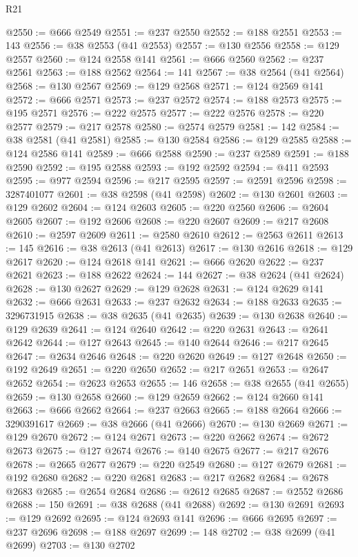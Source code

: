\begin{lexlean}{R21}
\begin{coremodule}
@2550 := @666 @2549
@2551 := @237 @2550
@2552 := @188 @2551
@2553 := 143
@2556 := @38 @2553 (@41 @2553)
@2557 := @130 @2556
@2558 := @129 @2557
@2560 := @124 @2558 @141
@2561 := @666 @2560
@2562 := @237 @2561
@2563 := @188 @2562
@2564 := 141
@2567 := @38 @2564 (@41 @2564)
@2568 := @130 @2567
@2569 := @129 @2568
@2571 := @124 @2569 @141
@2572 := @666 @2571
@2573 := @237 @2572
@2574 := @188 @2573
@2575 := @195 @2571
@2576 := @222 @2575
@2577 := @222 @2576
@2578 := @220 @2577
@2579 := @217 @2578
@2580 := @2574 @2579
@2581 := 142
@2584 := @38 @2581 (@41 @2581)
@2585 := @130 @2584
@2586 := @129 @2585
@2588 := @124 @2586 @141
@2589 := @666 @2588
@2590 := @237 @2589
@2591 := @188 @2590
@2592 := @195 @2588
@2593 := @192 @2592
@2594 := @411 @2593
@2595 := @977 @2594
@2596 := @217 @2595
@2597 := @2591 @2596
@2598 := 3287401077
@2601 := @38 @2598 (@41 @2598)
@2602 := @130 @2601
@2603 := @129 @2602
@2604 := @124 @2603
@2605 := @220 @2560
@2606 := @2604 @2605
@2607 := @192 @2606
@2608 := @220 @2607
@2609 := @217 @2608
@2610 := @2597 @2609
@2611 := @2580 @2610
@2612 := @2563 @2611
@2613 := 145
@2616 := @38 @2613 (@41 @2613)
@2617 := @130 @2616
@2618 := @129 @2617
@2620 := @124 @2618 @141
@2621 := @666 @2620
@2622 := @237 @2621
@2623 := @188 @2622
@2624 := 144
@2627 := @38 @2624 (@41 @2624)
@2628 := @130 @2627
@2629 := @129 @2628
@2631 := @124 @2629 @141
@2632 := @666 @2631
@2633 := @237 @2632
@2634 := @188 @2633
@2635 := 3296731915
@2638 := @38 @2635 (@41 @2635)
@2639 := @130 @2638
@2640 := @129 @2639
@2641 := @124 @2640
@2642 := @220 @2631
@2643 := @2641 @2642
@2644 := @127 @2643
@2645 := @140 @2644
@2646 := @217 @2645
@2647 := @2634 @2646
@2648 := @220 @2620
@2649 := @127 @2648
@2650 := @192 @2649
@2651 := @220 @2650
@2652 := @217 @2651
@2653 := @2647 @2652
@2654 := @2623 @2653
@2655 := 146
@2658 := @38 @2655 (@41 @2655)
@2659 := @130 @2658
@2660 := @129 @2659
@2662 := @124 @2660 @141
@2663 := @666 @2662
@2664 := @237 @2663
@2665 := @188 @2664
@2666 := 3290391617
@2669 := @38 @2666 (@41 @2666)
@2670 := @130 @2669
@2671 := @129 @2670
@2672 := @124 @2671
@2673 := @220 @2662
@2674 := @2672 @2673
@2675 := @127 @2674
@2676 := @140 @2675
@2677 := @217 @2676
@2678 := @2665 @2677
@2679 := @220 @2549
@2680 := @127 @2679
@2681 := @192 @2680
@2682 := @220 @2681
@2683 := @217 @2682
@2684 := @2678 @2683
@2685 := @2654 @2684
@2686 := @2612 @2685
@2687 := @2552 @2686
@2688 := 150
@2691 := @38 @2688 (@41 @2688)
@2692 := @130 @2691
@2693 := @129 @2692
@2695 := @124 @2693 @141
@2696 := @666 @2695
@2697 := @237 @2696
@2698 := @188 @2697
@2699 := 148
@2702 := @38 @2699 (@41 @2699)
@2703 := @130 @2702

\end{coremodule}
\end{lexlean}
